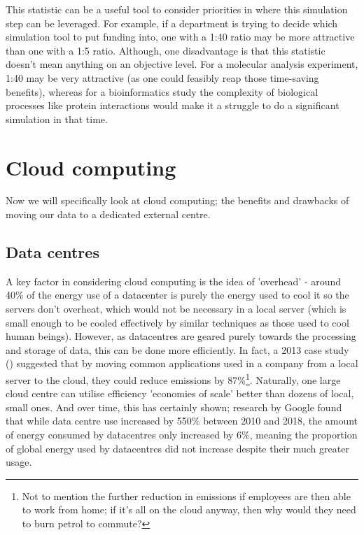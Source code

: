 \documentclass{article}
\begin{document}
This statistic can be a useful tool to consider priorities in where this simulation step can be leveraged. For example, if a department is trying to decide which simulation tool to put funding into, one with a 1:40 ratio may be more attractive than one with a 1:5 ratio. Although, one disadvantage is that this statistic doesn't mean anything on an objective level. For a molecular analysis experiment, 1:40 may be very attractive (as one could feasibly reap those time-saving benefits), whereas for a bioinformatics study the complexity of biological processes like protein interactions would make it a struggle to do a significant simulation in that time. 



\section{Cloud computing}
Now we will specifically look at cloud computing; the benefits and drawbacks of moving our data to a dedicated external centre.


\subsection{Data centres}
A key factor in considering cloud computing is the idea of 'overhead' - around 40\% of the energy use of a datacenter is purely the energy used to cool it so the servers don't overheat,  \citep{lannelongue2021ten} which would not be necessary in a local server (which is small enough to be cooled effectively by similar techniques as those used to cool human beings). However, as datacentres are geared purely towards the processing and storage of data, this can be done more efficiently. In fact, a 2013 case study (\citet{masanet2013energy}) suggested that by moving common applications used in a company from a local server to the cloud, they could reduce emissions by 87\%\footnote{Not to mention the further reduction in emissions if employees are then able to work from home; if it's all on the cloud anyway, then why would they need to burn petrol to commute?}. Naturally, one large cloud centre can utilise efficiency 'economies of scale' better than dozens of local, small ones. And over time, this has certainly shown; research by Google found that while data centre use increased by 550\% between 2010 and 2018, the amount of energy consumed by datacentres only increased by 6\%, meaning the proportion of global energy used by datacentres did not increase despite their much greater usage. \citep{masanet2020recalibrating}\newline
\end{document}
